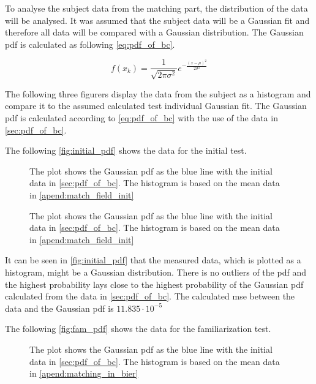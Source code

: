 To analyse the subject data from the matching part, the distribution of the data will be analysed. It was assumed that the subject data will be a Gaussian fit and therefore all data will be compared with a Gaussian distribution. The Gaussian \gls{pdf} is calculated as following \autoref{eq:pdf_of_bc}.

\begin{equation}\label{eq:pdf_of_bc}
f(x_{k}) = \frac{1}{\sqrt{2 \pi \sigma^2}}e^{-\frac{(x-\mu)^2}{2\sigma^2}}
\end{equation}


The following three figurers display the data from the subject as a histogram and compare it to the assumed calculated test individual Gaussian fit. The Gaussian \gls{pdf} is calculated according to \autoref{eq:pdf_of_bc} with the use of the data in \autoref{sec:pdf_of_bc}.


The following \autoref{fig:initial_pdf} shows the data for the initial test.

 \begin{figure}[H]
	\centering
	
		\caption{The plot shows the Gaussian \gls{pdf} as the blue line with the initial data in \autoref{sec:pdf_of_bc}. The histogram is based on the mean data in \autoref{apend:match_field_init}}
		\label{fig:initial_pdf}
\end{figure}

 \begin{figure}[H]
	\centering
	
		\caption{The plot shows the Gaussian \gls{pdf} as the blue line with the initial data in \autoref{sec:pdf_of_bc}. The histogram is based on the mean data in \autoref{apend:match_field_init}}
		\label{fig:initial_normplot}
\end{figure}


It can be seen in \autoref{fig:initial_pdf} that the measured data, which is plotted as a histogram, might be a Gaussian distribution. There is no outliers of the \gls{pdf} and the highest probability lays close to the highest probability of the Gaussian  \gls{pdf} calculated from the data in \autoref{sec:pdf_of_bc}. The calculated \gls{mse} between the data and the Gaussian  \gls{pdf} is $11.835 \cdot 10^{-5}$

The following \autoref{fig:fam_pdf} shows the data for the familiarization test.

 \begin{figure}[H]
	\centering
	
		\caption{The plot shows the Gaussian  \gls{pdf} as the blue line with the initial data in \autoref{sec:pdf_of_bc}. The histogram is based on the mean data in \autoref{apend:matching_in_bier}}
		\label{fig:fam_pdf}
\end{figure}


